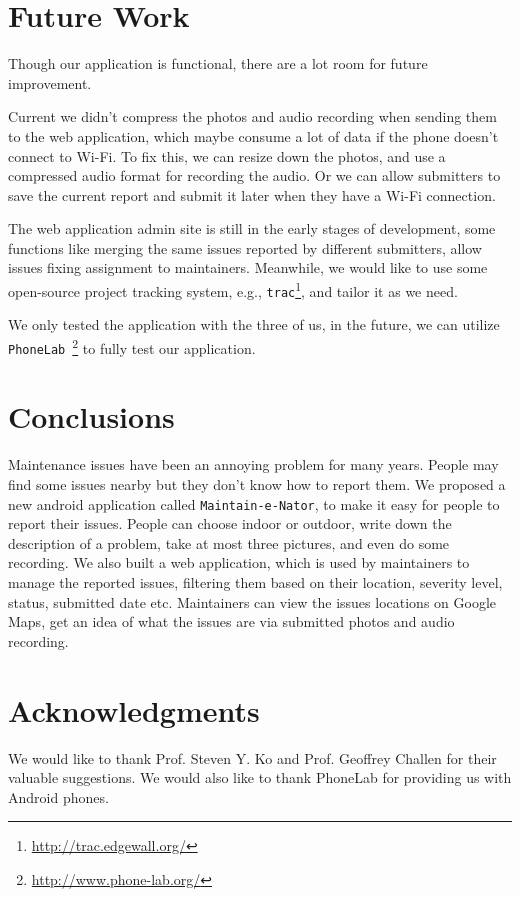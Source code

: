 \documentclass{acm_proc_article-sp}
\begin{document}
\section{Future Work}
Though our application is functional, there are a lot room for future improvement.
\begin{inparaenum}[(i)]
 \item Current we didn't compress the photos and audio recording when sending them to the web application, which maybe consume a lot of data if the
 phone doesn't connect to Wi-Fi. To fix this, we can resize down the photos, and use a compressed audio format for recording the audio. Or we can allow
 submitters to save the current report and submit it later when they have a Wi-Fi connection.
 \item The web application admin site is still in the early stages of development, some functions like merging the same issues reported by different submitters, allow issues fixing
 assignment to maintainers. 
 Meanwhile, we would like to use some open-source project tracking system, e.g., \texttt{trac}\footnote{\url{http://trac.edgewall.org/}}, and tailor it as we need.
 \item We only tested the application with the three of us, in the future, we can utilize \texttt{PhoneLab}~\footnote{\url{http://www.phone-lab.org/}} to
 fully test our application.
\end{inparaenum}

\section{Conclusions}
Maintenance issues have been an annoying problem for many years. People may find some issues nearby but they don't know how to report them. 
We proposed a new android application called \texttt{Maintain-e-Nator}, to make it easy for people to report their issues. People can choose indoor or outdoor, 
write down the description of a problem, take at most three pictures, and even do some recording. We also built a web application, 
which is used by maintainers to manage the reported issues, filtering them based on their location, severity level, status, submitted date etc. 
Maintainers can view the issues locations on Google Maps, get an idea of what the issues are via submitted photos and audio recording.

\section{Acknowledgments}
We would like to thank Prof. Steven Y. Ko and Prof. Geoffrey Challen for their valuable suggestions. We would also like to thank 
PhoneLab for providing us with Android phones.
\end{document}
